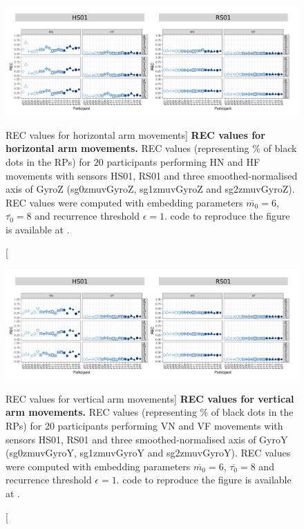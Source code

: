 \begin{figure}
\centering
\includegraphics[width=1.0\textwidth]{rec_aH}
    \caption
	[REC values for horizontal arm movements]{
	{\bf REC values for horizontal arm movements.}	
	REC values (representing \% of black dots in the RPs) for 
	20 participants performing HN and HF movements
	with sensors HS01, RS01 and three smoothed-normalised axis 
	of GyroZ (sg0zmuvGyroZ, sg1zmuvGyroZ and sg2zmuvGyroZ).
	REC values were computed with 
	embedding parameters $\overline{m_0}=6$, $\overline{\tau_0}=8$ and
	recurrence threshold $\epsilon=1$.
	\R code to reproduce the figure is available at 
	.
        }
    \label{fig:rec_aH}
\end{figure}
\begin{figure}
\centering
\includegraphics[width=1.0\textwidth]{rec_aV}
    \caption
	[REC values for vertical arm movements]{
	{\bf REC values for vertical arm movements.}	
	REC values (representing \% of black dots in the RPs) for 
	20 participants performing VN and VF movements
	with sensors HS01, RS01 and three smoothed-normalised axis 
	of GyroY (sg0zmuvGyroY, sg1zmuvGyroY and sg2zmuvGyroY).
	REC values were computed with 
	embedding parameters $\overline{m_0}=6$, $\overline{\tau_0}=8$ and
	recurrence threshold $\epsilon=1$.
	\R code to reproduce the figure is available at 
	.
        }
    \label{fig:rec_aV}
\end{figure}


